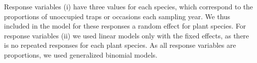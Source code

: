 \documentclass{article}
\begin{document}
Response variables (i) have three values for each species, which
correspond to the proportions of unoccupied traps or occasions each
sampling year. We thus included in the model for these responses a
random effect for plant species. For
response variables (ii) we used linear models only with the fixed
effects, as there is no repeated responses for each plant species. As
all response variables are proportions, we used generalized binomial
models.

\FloatBarrier












\end{document}
